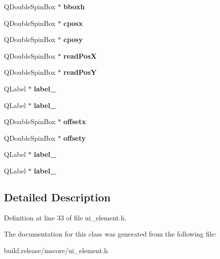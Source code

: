 \begin{DoxyCompactItemize}
Q\+Double\+Spin\+Box $\ast$ {\bfseries bboxh}
\item 
\mbox{\label{class_ui___element_base_ae3518a560bd27c621a6509a10404c293}} 
Q\+Double\+Spin\+Box $\ast$ {\bfseries cposx}
\item 
\mbox{\label{class_ui___element_base_ae97f154533c3cba10da902229dbbfba2}} 
Q\+Double\+Spin\+Box $\ast$ {\bfseries cposy}
\item 
\mbox{\label{class_ui___element_base_a75580de18f01cdc7efbcf13ac62fddab}} 
Q\+Double\+Spin\+Box $\ast$ {\bfseries read\+PosX}
\item 
\mbox{\label{class_ui___element_base_a4e46b5a1eb3eeec39eec878d539ccd94}} 
Q\+Double\+Spin\+Box $\ast$ {\bfseries read\+PosY}
\item 
\mbox{\label{class_ui___element_base_ac4603a5dc5be1d675bc86929fae3d89d}} 
Q\+Label $\ast$ {\bfseries label\+\_}
\item 
\mbox{\label{class_ui___element_base_aedfdaa7ec76f28cc8862e7654804ffb2}} 
Q\+Label $\ast$ {\bfseries label\+\_}
\item 
\mbox{\label{class_ui___element_base_a2cd42c21d98971c9e23564717281b5d2}} 
Q\+Double\+Spin\+Box $\ast$ {\bfseries offsetx}
\item 
\mbox{\label{class_ui___element_base_a4980a68c3011897d410ff316d64509a4}} 
Q\+Double\+Spin\+Box $\ast$ {\bfseries offsety}
\item 
\mbox{\label{class_ui___element_base_ae1ad869f8303acc22ed07545301a308b}} 
Q\+Label $\ast$ {\bfseries label\+\_}
\item 
\mbox{\label{class_ui___element_base_accce779565284799d776a23f34f35256}} 
Q\+Label $\ast$ {\bfseries label\+\_}
\end{DoxyCompactItemize}


\subsection{Detailed Description}


Definition at line 33 of file ui\+\_\+element.\+h.



The documentation for this class was generated from the following file\+:\begin{DoxyCompactItemize}
\item 
build.\+release/mscore/ui\+\_\+element.\+h\end{DoxyCompactItemize}

